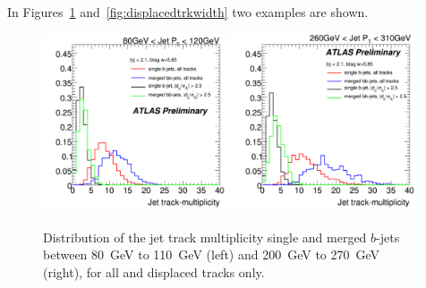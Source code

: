  In Figures~\ref{fig:displacedntrk} and~\ref{fig:displacedtrkwidth} two examples are shown.

\begin{figure}[tp]
\centering
\includegraphics[width=0.49\textwidth]{FIGS/TEMPFigs/DisplacedTracks/ntrk_singlemerged_AllandDisplaced_80-120.pdf}
\includegraphics[width=0.49\textwidth]{FIGS/TEMPFigs/DisplacedTracks/ntrk_singlemerged_AllandDisplaced_260-310.pdf}
\caption{Distribution of the jet track multiplicity single and merged $b$-jets between 80~GeV to 110~GeV (left) and 200~GeV to 270~GeV (right), for all and displaced tracks only.}
\label{fig:displacedntrk}
\end{figure}


